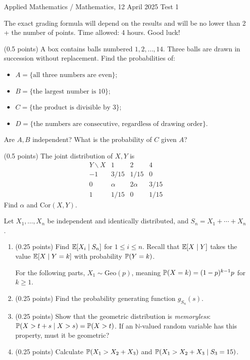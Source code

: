 \documentclass[a4paper]{report}
\begin{document}
\noindent Applied Mathematics / Mathematics, 12 April 2025 \hfill Test 1
\hrulefill
\begin{it}The exact grading formula will depend on the results and will be no lower than 2 + the number of points. Time allowed: 4 hours. Good luck!\end{it}
\begin{problem} (0.5 points)
A box contains balls numbered $1,2,\ldots,14$. Three balls are drawn in succession without replacement. Find the probabilities of:
\begin{itemize}
\item $A=\{\text{all three numbers are even}\}$;
\item $B=\{\text{the largest number is 10}\}$;
\item $C=\{\text{the product is divisible by 3}\}$;
\item $D=\{\text{the numbers are consecutive, regardless of drawing order}\}$.
\end{itemize}
Are $A,B$ independent? What is the probability of $C$ given $A$?
\end{problem}
\begin{problem} (0.5 points)
The joint distribution of $X,Y$ is
\[\begin{array}{c|ccc}Y\backslash X&1&2&4\\\hline -1&3/15&1/15&0\\0&\alpha&2\alpha&3/15\\1&1/15&0&1/15\end{array}\]
Find $\alpha$ and $\mathrm{Cor}(X,Y)$.
\end{problem}
\begin{problem}
Let $X_1,\ldots,X_n$ be independent and identically distributed, and $S_n=X_1+\cdots+X_n$.
\begin{enumerate}
\item (0.25 points) Find $\E[X_i\mid S_n]$ for $1\leq i\leq n$. Recall that $\E[X\mid Y]$ takes the value $\E[X\mid Y=k]$ with probability $\P(Y=k)$.

For the following parts, $X_1\sim\mathrm{Geo}(p)$, meaning $\P(X=k)=(1-p)^{k-1}p$ for $k\geq1$.
\item (0.25 points) Find the probability generating function $g_{S_n}(s)$.
\item (0.25 points) Show that the geometric distribution is \emph{memoryless}: $\P(X>t+s\mid X>s)=\P(X>t)$. If an $\mathbb N$-valued random variable has this property, must it be geometric?
\item (0.25 points) Calculate $\P(X_1>X_2+X_3)$ and $\P(X_1>X_2+X_3\mid S_3=15)$.
\end{enumerate}
\end{problem}
\end{document}
